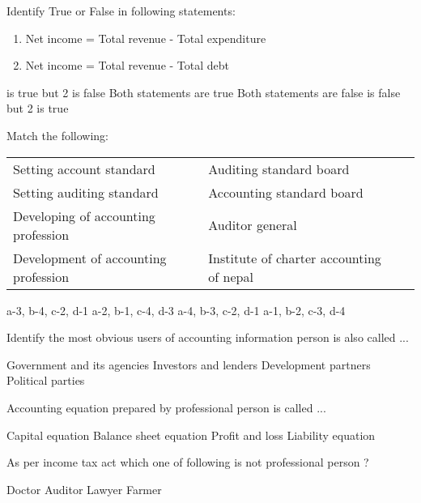 \begin{questions}
\question Identify True or False in following statements:
  \begin{enumerate}
  \item Net income = Total revenue - Total expenditure
  \item Net income = Total revenue - Total debt
  \end{enumerate}
  \begin{choices}
   is true but 2 is false
  \choice Both statements are true
  \choice Both statements are false
   is false but 2 is true
  \end{choices}

\question Match the following:
  \begin{table}[h]
  \centering
  \begin{tabular}{lll}
    Setting account standard & Auditing standard board \\[2mm]
    Setting auditing standard & Accounting standard board \\
    Developing of accounting profession & Auditor general \\
    Development of accounting profession & Institute of charter accounting of nepal \\
  \end{tabular}
  \end{table}
  \begin{choices}
  \choice a-3, b-4, c-2, d-1
  \choice a-2, b-1, c-4, d-3
  \choice a-4, b-3, c-2, d-1
  \choice a-1, b-2, c-3, d-4
  \end{choices}

\question Identify the most obvious users of accounting information person is also called ...
  \begin{choices}
  \choice Government and its agencies
  \choice Investors and lenders
  \choice Development partners
  \choice Political parties
  \end{choices}

\question Accounting equation prepared by professional person is called ...
  \begin{choices}
  \choice Capital equation
  \choice Balance sheet equation
  \choice Profit and loss
  \choice Liability equation
  \end{choices}

\question As per income tax act which one of following is not professional person ?
  \begin{choices}
  \choice Doctor
  \choice Auditor
  \choice Lawyer
  \choice Farmer
  \end{choices}


\end{questions}
